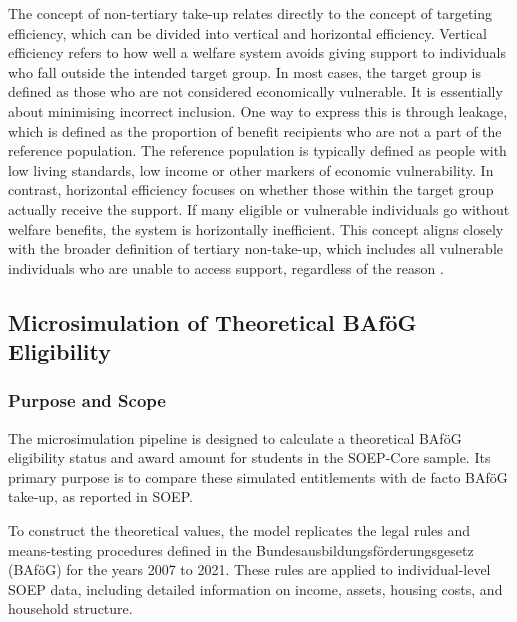 The concept of non-tertiary take-up relates directly to the concept of targeting efficiency, which can be
divided into vertical and horizontal efficiency. Vertical efficiency refers to how well a welfare system avoids
giving support to individuals who fall outside the intended target group. In most cases, the target group
is defined as those who are not considered economically vulnerable. It is essentially about minimising
incorrect inclusion. One way to express this is through leakage, which is defined as the proportion of
benefit recipients who are not a part of the reference population. The reference population is typically
defined as people with low living standards, low income or other markers of economic vulnerability.
In contrast, horizontal efficiency focuses on whether those within the target group actually receive the
support. If many eligible or vulnerable individuals go without welfare benefits, the system is horizontally
inefficient. This concept aligns closely with the broader definition of tertiary non-take-up, which includes
all vulnerable individuals who are unable to access support, regardless of the reason \citep{mechelen_who_2017, goedeme_concept_2020}.


\subsection{Microsimulation of Theoretical BAföG Eligibility} 
\subsubsection{Purpose and Scope}
The microsimulation pipeline is designed to calculate a theoretical BAföG eligibility status and award amount for students in the SOEP-Core sample. 
Its primary purpose is to compare these simulated entitlements with de facto BAföG take-up, as reported in SOEP.

To construct the theoretical values, the model replicates the legal rules and means-testing procedures defined in the Bundesausbildungsförderungsgesetz (BAföG) for the years 2007 to 2021. 
These rules are applied to individual-level SOEP data, including detailed information on income, assets, housing costs, and household structure.

